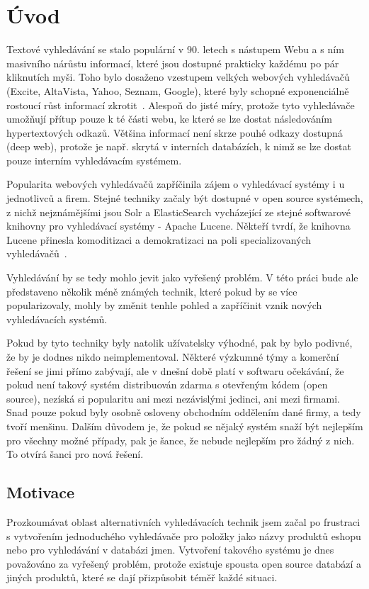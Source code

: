 \documentclass[11pt,letterpaper,oneside,openright]{book}
\begin{document}
\frontmatter
{\hypersetup{hidelinks}
    \tableofcontents
}

\mainmatter
\chapter{Úvod}
Textové vyhledávání se stalo populární v 90. letech s nástupem Webu a s ním
masivního nárůstu informací, které jsou dostupné prakticky každému po pár
kliknutích myši. Toho bylo dosaženo vzestupem velkých webových vyhledávačů
(Excite, AltaVista, Yahoo, Seznam, Google), které byly schopné exponenciálně
rostoucí růst informací zkrotit~\cite{search_history}. Alespoň do jisté míry,
protože tyto vyhledávače umožňují přítup pouze k té části webu, ke které se lze
dostat následováním hypertextových odkazů. Většina informací není skrze pouhé
odkazy dostupná (deep web), protože je např. skrytá v interních databázích, k
nimž se lze dostat pouze interním vyhledávacím systémem.

Popularita webových vyhledávačů zapříčinila zájem o vyhledávací systémy i u
jednotlivců a firem. Stejné techniky začaly být dostupné v open source
systémech, z nichž nejznámějšími jsou Solr a ElasticSearch vycházející ze
stejné softwarové knihovny pro vyhledávací systémy - Apache Lucene. Někteří
tvrdí, že knihovna Lucene přinesla komoditizaci a demokratizaci na poli
specializovaných vyhledávačů~\cite{dion_almaer,javaworld}.

Vyhledávání by se tedy mohlo jevit jako vyřešený problém. V této práci bude ale
představeno několik méně známých technik, které pokud by se více
popularizovaly, mohly by změnit tenhle pohled a zapříčinit vznik nových
vyhledávacích systémů.

Pokud by tyto techniky byly natolik užívatelsky výhodné, pak by bylo podivné,
že by je dodnes nikdo neimplementoval. Některé výzkumné týmy a komerční řešení
se jimi přímo zabývají, ale v dnešní době platí v softwaru očekávání, že pokud
není takový systém distribuován zdarma s otevřeným kódem (open source), nezíská
si popularitu ani mezi nezávislými jedinci, ani mezi firmami. Snad pouze pokud
byly osobně osloveny obchodním oddělením dané firmy, a tedy tvoří menšinu.
Dalším důvodem je, že pokud se nějaký systém snaží být nejlepším pro všechny
možné případy, pak je šance, že nebude nejlepším pro žádný z nich. To otvírá
šanci pro nová řešení.

\section{Motivace}
Prozkoumávat oblast alternativních vyhledávacích technik jsem začal po
frustraci s vytvořením jednoduchého vyhledávače pro položky jako názvy produktů
eshopu nebo pro vyhledávání v databázi jmen. Vytvoření takového systému je dnes
považováno za vyřešený problém, protože existuje spousta open source databází a
jiných produktů, které se dají přizpůsobit téměř každé situaci.
\end{document}

